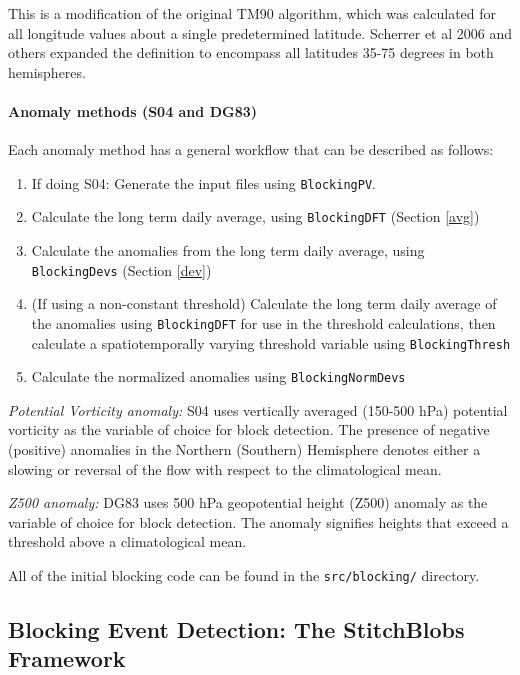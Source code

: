 \documentclass{article}
\begin{document}
This is a modification of the original TM90 algorithm, which was calculated for all longitude values about a single predetermined latitude. Scherrer et al 2006 and others expanded the definition to encompass all latitudes 35-75 degrees in both hemispheres.


\paragraph{Anomaly methods (S04 and DG83)} Each anomaly method has a general workflow that can be described as follows:

\begin{enumerate}
\item If doing S04: Generate the input files using \texttt{BlockingPV}.
\item Calculate the long term daily average, using \texttt{BlockingDFT} (Section \ref{avg})
\item Calculate the anomalies from the long term daily average, using \texttt{BlockingDevs} (Section \ref{dev})
\item (If using a non-constant threshold) Calculate the long term daily average of the anomalies using \texttt{BlockingDFT} for use in the threshold calculations, then calculate a spatiotemporally varying threshold variable using \texttt{BlockingThresh}
\item Calculate the normalized anomalies using \texttt{BlockingNormDevs}
\end{enumerate}


\textit{Potential Vorticity anomaly:} S04 uses vertically averaged (150-500 hPa) potential vorticity as the variable of choice for block detection. The presence of negative (positive) anomalies in the Northern (Southern) Hemisphere denotes either a slowing or reversal of the flow with respect to the climatological mean. 

\textit{Z500 anomaly:} DG83 uses 500 hPa geopotential height (Z500) anomaly as the variable of choice for block detection. The anomaly signifies heights that exceed a threshold above a climatological mean.

All of the initial blocking code can be found in the \texttt{src/blocking/} directory.

\subsection{Blocking Event Detection: The StitchBlobs Framework} 
\end{document}
